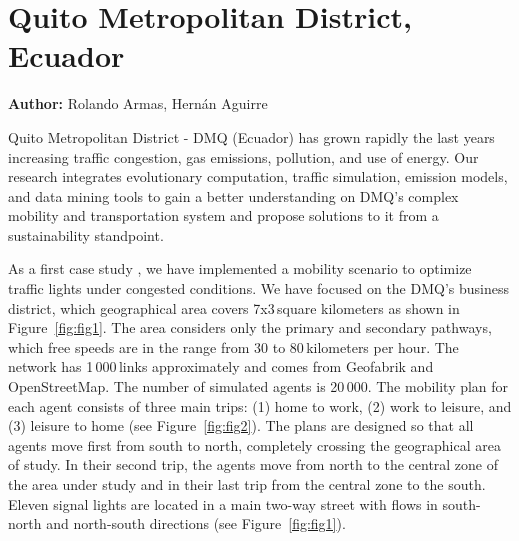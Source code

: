 \section{Quito Metropolitan District, Ecuador}
\label{sec:quito}
\hfill \textbf{Author:} Rolando Armas, Hernán Aguirre

Quito Metropolitan District - DMQ (Ecuador) has grown rapidly the last years increasing traffic congestion, gas emissions, pollution, and use of energy. Our research integrates evolutionary computation, traffic simulation, emission models, and data mining tools to gain a better understanding on DMQ’s complex mobility and transportation system and propose solutions to it from a sustainability standpoint.

As a first case study \citep[][]{ArmasEtAl_SEAL_2014}, we have implemented a mobility scenario to optimize traffic lights under congested conditions. We have focused on the
DMQ’s business district, which geographical area covers 7x3\,square kilometers as shown in Figure~\ref{fig:fig1}. The area considers only the primary and secondary pathways, which free speeds are in the range from 30 to 80\,kilometers per hour. The network has 1\,000\,links approximately and comes from Geofabrik and OpenStreetMap. The number of simulated agents is 20\,000. The mobility plan for each agent consists of three main trips: (1) home to work, (2) work to leisure, and (3) leisure to home (see Figure~\ref{fig:fig2}). The plans are designed so that all agents move first from south to north, completely crossing the geographical area of study. In their second trip, the agents move from north to the central zone of the area under study and in their last trip from the central zone to the south. Eleven signal lights are located in a main two-way street with flows in south-north and north-south directions (see Figure~\ref{fig:fig1}).

